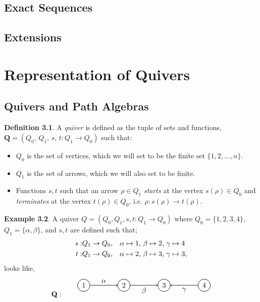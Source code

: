 \documentclass[11.5pt, twoside, a4paper, titlepage]{report}
\providecommand{\equ}[0]{\begin{equation*}}
\providecommand{\eequ}[0] {\end{equation*}}
\theoremstyle{definition}
\newtheorem{mydef}{Definition}[section]
\newtheorem{eg}[mydef]{Example}
\theoremstyle{plain}
\begin{document}
\section{Exact Sequences}

\section{Extensions}










\chapter{Representation of Quivers}

\section{Quivers and Path Algebras}

\begin{mydef}
A \emph{quiver} is defined as the tuple of sets and functions, $\mathbf{Q}=(Q_0\text{, }Q_1\text{, }s\text{, }t: Q_1 \to Q_0)$ such that:
\begin{itemize}
\item $Q_0$ is the set of vertices, which we will set to be the finite set $\{1, 2, \dots, n\}$.
\item $Q_1$ is the set of arrows, which we will also set to be finite.
\item Functions $s, t$ such that an arrow $\rho \in Q_1$ \emph{starts} at the vertex $s(\rho)\in Q_0$ and \emph{terminates} at the vertex $t(\rho)\in Q_0$, i.e. $\rho: s(\rho) \to t(\rho)$.
\end{itemize}
\end{mydef}

\begin{eg} \label{ininquivereg}
A quiver $Q=(Q_0, Q_1, s, t:Q_1 \to Q_0)$ where $Q_0=\{1, 2, 3, 4\}$, $Q_1=\{\alpha, \beta\}$, and $s, t$ are defined such that;
\begin{align*}
s:& Q_1 \to Q_0\text{,\quad} \alpha \mapsto 1\text{, } \beta \mapsto 2\text{, } \gamma \mapsto 4\\
t:& Q_1 \to Q_0\text{,\quad} \alpha \mapsto 2\text{, } \beta \mapsto 3\text{, } \gamma \mapsto 3,
\end{align*}
looks like,
\equ
\mathbf{Q}: \qquad
\begin{tikzpicture}[->,-latex, auto, every path/.style={->, semithick}, main node/.style={draw, circle}]
\node	[main node]		(1) at (0,0)		{1};
\node	[main node]		(2) at (2,0)		{2};
\node	[main node]		(3) at (4,0)		{3};
\node [main node]		(4) at (6,0)		{4};

\draw (1) edge node [auto] {$\alpha$} (2);
\draw (2) edge node [auto, swap] {$\beta$} (3);
\draw (4) edge node [auto] {$\gamma$} (3);
\end{tikzpicture}
\eequ
\end{eg}
\end{document}
